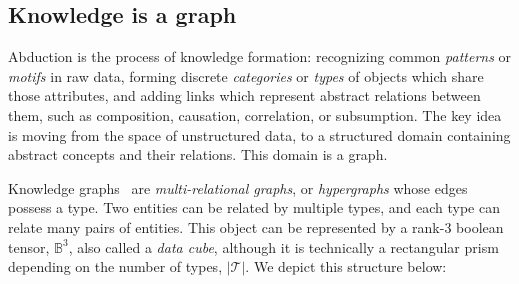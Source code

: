 \documentclass[11pt]{article}
\begin{document}
%

    \subsection{Knowledge is a graph}\label{subsec:kgs}

    Abduction is the process of knowledge formation: recognizing common \textit{patterns} or \textit{motifs} in raw data, forming discrete \textit{categories} or \textit{types} of objects which share those attributes, and adding links which represent abstract relations between them, such as composition, causation, correlation, or subsumption. The key idea is moving from the space of unstructured data, to a structured domain containing abstract concepts and their relations. This domain is a graph.

    Knowledge graphs~\citep{hogan2020knowledge} are \textit{multi-relational graphs}, or \textit{hypergraphs} whose edges possess a type. Two entities can be related by multiple types, and each type can relate many pairs of entities. This object can be represented by a rank-3 boolean tensor, $\mathbb{B}^3$, also called a \textit{data cube}, although it is technically a rectangular prism depending on the number of types, $|\mathcal{T}|$. We depict this structure below:

\end{document}

